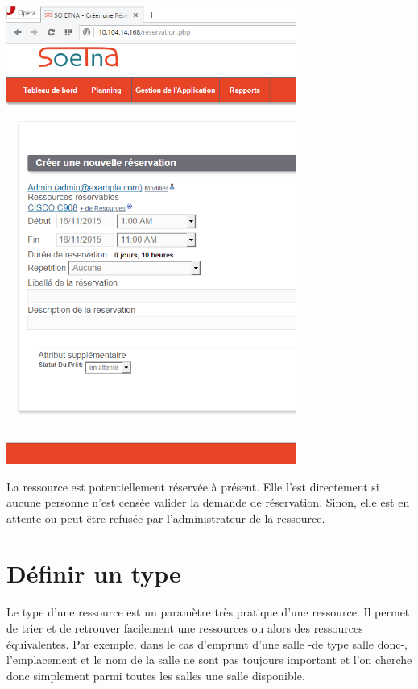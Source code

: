 \documentclass[a4paper,11pt]{article}
\begin{document}
\begin{center}
	\includegraphics[height=15cm]{./resa2.PNG}
\end{center}

\vspace{1 cm}

La ressource est potentiellement réservée à présent. Elle l'est directement si aucune personne
n'est censée valider la demande de réservation. Sinon, elle est en attente ou peut être refusée
par l'administrateur de la ressource.

\newpage

\section{Définir un type}

Le type d'une ressource est un paramètre très pratique d'une ressource. Il permet de trier et de retrouver facilement une ressources ou alors des ressources équivalentes. Par exemple, dans le cas d'emprunt d'une salle -de type salle donc-, l'emplacement et le nom de la salle ne sont pas toujours important et l'on cherche donc simplement parmi toutes les salles une salle disponible.
\end{document}
